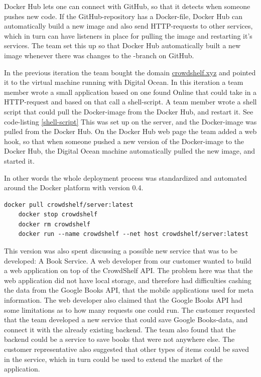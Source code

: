 Docker Hub lets one can connect with GitHub, so that it detects when someone pushes new code. If the GitHub-repository has a Docker-file, Docker Hub can automatically build a new image and also send HTTP-requests to other services, which in turn can have listeners in place for pulling the image and restarting it's services. \cite{dockerhub-builds} The team set this up so that Docker Hub automatically built a new image whenever there was changes to the -\gls{branch} on GitHub.

 In the previous iteration the team bought the domain \url{crowdshelf.xyz} and pointed it to the virtual machine running with Digital Ocean. In this iteration a team member wrote a small application\cite{essoen-dockerpuller} based on one found Online \cite{dockerpuller} that could take in a HTTP-request and based on that call a shell-script. A team member wrote a shell script that could pull the Docker-image from the Docker Hub, and restart it. See code-listing \ref{shell-script} This was set up on the server, and the Docker-image was pulled from the Docker Hub. On the Docker Hub web page the team added a web hook, so that when someone pushed a new version of the Docker-image to the Docker Hub, the Digital Ocean machine automatically pulled the new image, and started it.

In other words the whole deployment process was standardized and automated around the Docker platform with version 0.4.

\begin{lstlisting}[float,floatplacement=H,frame=single, columns=fullflexible, caption=Shell-script used by the virtual machine running at Digital Ocean to restart the server application with Docker when there is deployed a new version, label=shell-script]
    docker pull crowdshelf/server:latest
    docker stop crowdshelf
    docker rm crowdshelf
    docker run --name crowdshelf --net host crowdshelf/server:latest
\end{lstlisting}


This version was also spent discussing a possible new service that was to be developed: A Book Service. A web developer from our customer wanted to build a web application on top of the CrowdShelf \gls{API}. The problem here was that the web application did not have local storage, and therefore had difficulties cashing the data from the Google Books \gls{API}, that the mobile applications used for meta information. The web developer also claimed that the Google Books \gls{API} had some limitations as to how many requests one could run. The customer requested that the team developed a new service that could save Google Books-data, and connect it with the already existing \gls{backend}. The team also found that the \gls{backend} could be a service to save books that were not anywhere else. The customer representative also suggested that other types of items could be saved in the service, which in turn could be used to extend the market of the application. 

